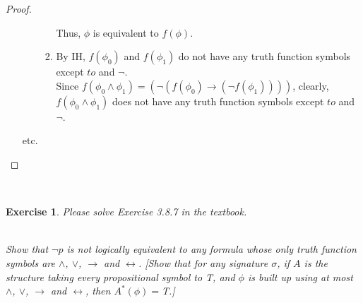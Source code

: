 \documentclass[12pt,a4paper]{article}
\theoremstyle{plain}
\newtheorem{exercise}{Exercise}
\begin{document}
\begin{proof}
\begin{itemize}
\begin{enumerate}
\begin{enumerate}
                                Thus, $\phi$ is equivalent to $f(\phi)$.
                            \item
                                By IH, $f(\phi_0)$ and $f(\phi_1)$ do not have any truth function symbols except $to$ and $\neg$.\\
                                Since $f(\phi_0 \wedge \phi_1)=( \neg ( f (\phi_0) \rightarrow ( \neg f (\phi_1) ) ) ) $, clearly, $f(\phi_0 \wedge \phi_1)$ does not have any truth function symbols except $to$ and $\neg$.\\
                        \end{enumerate}
                \end{enumerate}
                etc.
        \end{itemize}
\end{proof}

\ \\
\begin{exercise}
Please solve Exercise 3.8.7 in the textbook.

\ \\
Show that $\neg p$ is not logically equivalent to any formula whose only truth function symbols are $\wedge$, $\vee$, $\rightarrow$ and $\leftrightarrow$. 
[Show that for any signature $\sigma$, if $A$ is the structure taking every propositional symbol to T, and $\phi$ is built
up using at most $\wedge$, $\vee$, $\rightarrow$ and $\leftrightarrow$, then $A^* (\phi) = $T.]
\end{exercise}
\end{document}
